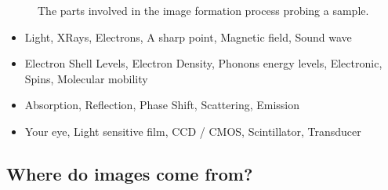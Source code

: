 \documentclass[letterpaper,10pt,english]{sphinxmanual}
\begin{document}
\begin{figure}[htbp]
\centering
\capstart

\noindent{}
\caption{The parts involved in the image formation process probing a sample.}\label{\detokenize{01-Introduction:id18}}\end{figure}


\begin{itemize}
\item {} 
\sphinxAtStartPar
{} Light, X\sphinxhyphen{}Rays, Electrons, A sharp point, Magnetic field, Sound wave

\item {} 
\sphinxAtStartPar
{} Electron Shell Levels, Electron Density, Phonons energy levels, Electronic, Spins, Molecular mobility

\item {} 
\sphinxAtStartPar
{} Absorption, Reflection, Phase Shift, Scattering, Emission

\item {} 
\sphinxAtStartPar
{} Your eye, Light sensitive film, CCD / CMOS, Scintillator, Transducer

\end{itemize}


\subsection{Where do images come from?}
\label{\detokenize{01-Introduction:where-do-images-come-from}}
\end{document}
